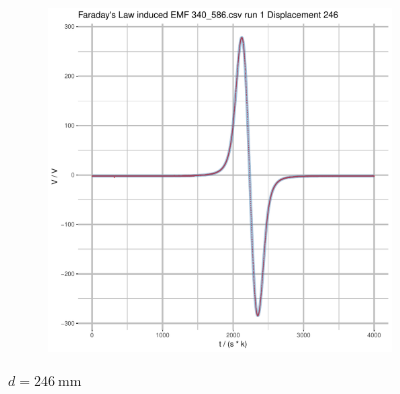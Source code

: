 \documentclass[a4paper,11pt]{article}
\begin{document}
\begin{figure}[b]
\begin{subfigure}{.5\textwidth}
\end{subfigure}
\begin{subfigure}{.7\textwidth}
    \centering
    \includegraphics[width=\textwidth,page=3]{Rplots.pdf}
\end{subfigure}
\caption{\(d = \SI{246}{\milli\metre}\)}
\end{figure}
\end{document}
